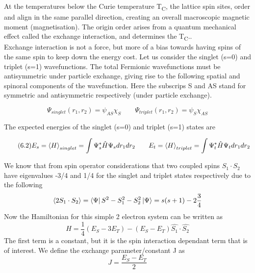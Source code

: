 \documentclass[12pt]{article}
\begin{document}
At the temperatures below the Curie temperature T\textsubscript{C}, the lattice spin sites, order and align in the same parallel direction, creating an overall macroscopic magnetic moment (magnetisation). The origin order arises from a quantum mechanical effect called the exchange interaction, and determines the T\textsubscript{C}.. 
\\
Exchange interaction is not a force, but more of a bias towards having spins of the same spin to keep down the energy cost. Let us consider the singlet (s=0) and triplet (s=1) wavefunctions. The total Fermionic wavefunctions must be antisymmetric under particle exchange, giving rise to the following spatial and spinoral components of the wavefunction. Here the subscrips S and AS stand for symmetric and antisymmetric respectively (under particle exchange).

\begin{equation} \label{4.1} \tag{6.1}
\Psi_{singlet}(r_1,r_2)=\psi_{AS}\chi_S \qquad \Psi_{triplet}(r_1,r_2)=\psi_{S}\chi_{AS}
\end{equation}

The expected energies of the singlet (s=0) and triplet (s=1) states are

\begin{equation} \label{4.1} \tag{6.2}
E_s=\expval{H}_{singlet}=\int \Psi_s^*\hat{H}\Psi_sdr_1dr_2 \qquad E_t=\expval{H}_{triplet}=\int \Psi_t^*\hat{H}\Psi_tdr_1dr_2
\end{equation}



We know that from spin operator considerations that two coupled spins $S_1\cdot S_2$ have eigenvalues -3/4 and 1/4 for the singlet and triplet states respectively\cite{blundell} due to the following
$$\expval{2S_1\cdot S_2}=\bra{\Psi}S^2-S_1^2-S_2^2\ket{\Psi}=s(s+1)-2\frac{3}{4}$$
Now the Hamiltonian for this simple 2 electron system can be written as
\begin{equation} \label{4.1} \tag{6.3}
H=\frac{1}{4}(E_S-3E_T)-(E_S-E_T)\hat{S_1} \cdot \hat{S_2}
\end{equation}
The first term is a constant, but it is the spin interaction dependant term that is of interest.
We define the exchange parameter/constant J \cite{blundell}as
\begin{equation} \label{4.1} \tag{6.4}
J=\frac{E_S-E_T}{2}
\end{equation}
\end{document}
